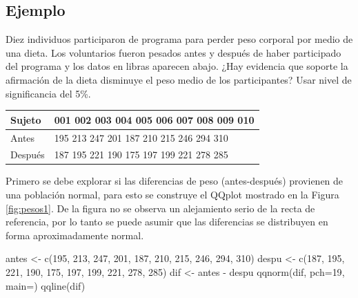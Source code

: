 \documentclass[
]{book}
\makeatletter
\newenvironment{Shaded}{\begin{snugshade}}{\end{snugshade}}
\newcommand{\AttributeTok}[1]{\textcolor[rgb]{0.77,0.63,0.00}{#1}}
\newcommand{\DecValTok}[1]{\textcolor[rgb]{0.00,0.00,0.81}{#1}}
\newcommand{\FunctionTok}[1]{\textcolor[rgb]{0.00,0.00,0.00}{#1}}
\newcommand{\NormalTok}[1]{#1}
\newcommand{\OtherTok}[1]{\textcolor[rgb]{0.56,0.35,0.01}{#1}}
\newcommand{\SpecialCharTok}[1]{\textcolor[rgb]{0.00,0.00,0.00}{#1}}
\newcommand{\StringTok}[1]{\textcolor[rgb]{0.31,0.60,0.02}{#1}}
\newenvironment{kframe}{%
\medskip{}
\setlength{\fboxsep}{.8em}
 \def\at@end@of@kframe{}%
 \ifinner\ifhmode%
  \def\at@end@of@kframe{\end{minipage}}%
  \begin{minipage}{\columnwidth}%
 \fi\fi%
 \def\FrameCommand##1{\hskip\@totalleftmargin \hskip-\fboxsep
 \colorbox{shadecolor}{##1}\hskip-\fboxsep
     \hskip-\linewidth \hskip-\@totalleftmargin \hskip\columnwidth}%
 \MakeFramed {\advance\hsize-\width
   \@totalleftmargin\z@ \linewidth\hsize
   \@setminipage}}%
 {\par\unskip\endMakeFramed%
 \at@end@of@kframe}
\renewenvironment{Shaded}{\begin{kframe}}{\end{kframe}}
\makeatother
\begin{document}
\hypertarget{ejemplo-74}{%
\subsection*{Ejemplo}\label{ejemplo-74}}

Diez individuos participaron de programa para perder peso corporal por medio de una dieta. Los voluntarios fueron pesados antes y después de haber participado del programa y los datos en libras aparecen abajo. ¿Hay evidencia que soporte la afirmación de la dieta disminuye el peso medio de los participantes? Usar nivel de significancia del 5\%.

\begin{longtable}[]{@{}ll@{}}
\toprule
Sujeto & 001 002 003 004 005 006 007 008 009 010 \\
\midrule
\endhead
Antes & 195 213 247 201 187 210 215 246 294 310 \\
Después & 187 195 221 190 175 197 199 221 278 285 \\
\bottomrule
\end{longtable}

Primero se debe explorar si las diferencias de peso (antes-después) provienen de una población normal, para esto se construye el QQplot mostrado en la Figura \ref{fig:pesos1}. De la figura no se observa un alejamiento serio de la recta de referencia, por lo tanto se puede asumir que las diferencias se distribuyen en forma aproximadamente normal.

\begin{Shaded}
\begin{Highlighting}[]
\NormalTok{antes }\OtherTok{\textless{}{-}} \FunctionTok{c}\NormalTok{(}\DecValTok{195}\NormalTok{, }\DecValTok{213}\NormalTok{, }\DecValTok{247}\NormalTok{, }\DecValTok{201}\NormalTok{, }\DecValTok{187}\NormalTok{, }\DecValTok{210}\NormalTok{, }\DecValTok{215}\NormalTok{, }\DecValTok{246}\NormalTok{, }\DecValTok{294}\NormalTok{, }\DecValTok{310}\NormalTok{)}
\NormalTok{despu }\OtherTok{\textless{}{-}} \FunctionTok{c}\NormalTok{(}\DecValTok{187}\NormalTok{, }\DecValTok{195}\NormalTok{, }\DecValTok{221}\NormalTok{, }\DecValTok{190}\NormalTok{, }\DecValTok{175}\NormalTok{, }\DecValTok{197}\NormalTok{, }\DecValTok{199}\NormalTok{, }\DecValTok{221}\NormalTok{, }\DecValTok{278}\NormalTok{, }\DecValTok{285}\NormalTok{)}
\NormalTok{dif }\OtherTok{\textless{}{-}}\NormalTok{ antes }\SpecialCharTok{{-}}\NormalTok{ despu}
\FunctionTok{qqnorm}\NormalTok{(dif, }\AttributeTok{pch=}\DecValTok{19}\NormalTok{, }\AttributeTok{main=}\StringTok{\textquotesingle{}\textquotesingle{}}\NormalTok{)}
\FunctionTok{qqline}\NormalTok{(dif)}
\end{Highlighting}
\end{Shaded}
\end{document}
